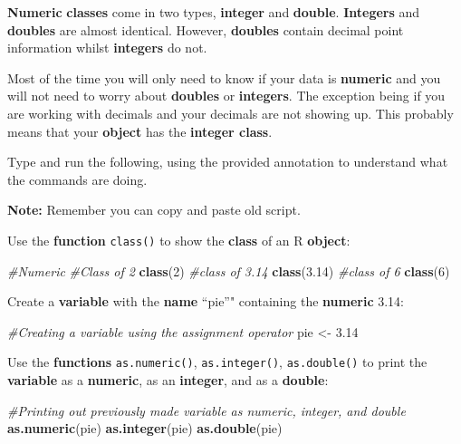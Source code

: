 \documentclass[]{book}
\newenvironment{Shaded}{\begin{snugshade}}{\end{snugshade}}
\newcommand{\KeywordTok}[1]{\textcolor[rgb]{0.13,0.29,0.53}{\textbf{#1}}}
\newcommand{\DecValTok}[1]{\textcolor[rgb]{0.00,0.00,0.81}{#1}}
\newcommand{\FloatTok}[1]{\textcolor[rgb]{0.00,0.00,0.81}{#1}}
\newcommand{\StringTok}[1]{\textcolor[rgb]{0.31,0.60,0.02}{#1}}
\newcommand{\CommentTok}[1]{\textcolor[rgb]{0.56,0.35,0.01}{\textit{#1}}}
\newcommand{\NormalTok}[1]{#1}
\begin{document}
\textbf{Numeric} \textbf{classes} come in two types, \textbf{integer}
and \textbf{double}. \textbf{Integers} and \textbf{doubles} are almost
identical. However, \textbf{doubles} contain decimal point information
whilst \textbf{integers} do not.

Most of the time you will only need to know if your data is
\textbf{numeric} and you will not need to worry about \textbf{doubles}
or \textbf{integers}. The exception being if you are working with
decimals and your decimals are not showing up. This probably means that
your \textbf{object} has the \textbf{integer class}.

Type and run the following, using the provided annotation to understand
what the commands are doing.

\textbf{Note:} Remember you can copy and paste old script.

Use the \textbf{function} \texttt{class()} to show the \textbf{class} of
an R \textbf{object}:

\begin{Shaded}
\begin{Highlighting}[]
\CommentTok{#Numeric}
\CommentTok{#Class of 2}
\KeywordTok{class}\NormalTok{(}\DecValTok{2}\NormalTok{)}
\CommentTok{#class of 3.14}
\KeywordTok{class}\NormalTok{(}\FloatTok{3.14}\NormalTok{)}
\CommentTok{#class of 6}
\KeywordTok{class}\NormalTok{(}\DecValTok{6}\NormalTok{)}
\end{Highlighting}
\end{Shaded}

Create a \textbf{variable} with the \textbf{name} ``pie''" containing
the \textbf{numeric} 3.14:

\begin{Shaded}
\begin{Highlighting}[]
\CommentTok{#Creating a variable using the assignment operator}
\NormalTok{pie <-}\StringTok{ }\FloatTok{3.14}
\end{Highlighting}
\end{Shaded}

Use the \textbf{functions} \texttt{as.numeric()}, \texttt{as.integer()},
\texttt{as.double()} to print the \textbf{variable} as a
\textbf{numeric}, as an \textbf{integer}, and as a \textbf{double}:

\begin{Shaded}
\begin{Highlighting}[]
\CommentTok{#Printing out previously made variable as numeric, integer, and double}
\KeywordTok{as.numeric}\NormalTok{(pie)}
\KeywordTok{as.integer}\NormalTok{(pie)}
\KeywordTok{as.double}\NormalTok{(pie)}
\end{Highlighting}
\end{Shaded}
\end{document}
